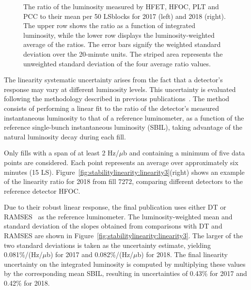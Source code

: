 \begin{figure}[!ht]
\caption[Luminosity Ratios (HFET, HFOC, PLT, PCC) to Mean per 50 LS Blocks (2017 & 2018)]{The ratio of the luminosity measured by HFET, HFOC, PLT and PCC to their mean per 50 LSblocks for 2017 (left) and 2018 (right). The upper row shows the ratio as a function of integrated luminosity, while the lower row displays the luminosity-weighted average of the ratios. The error bars signify the weighted standard deviation over the 20-minute units. The striped area represents the unweighted standard deviation of the four average ratio values.}
\label{fig:stabilitylinearity:stability}
\end{figure}

The linearity systematic uncertainty arises from the fact that a detector’s response may vary at different luminosity levels. This uncertainty is evaluated following the methodology described in previous publications~\cite{pas_17, pas_18}. The method consists of performing a linear fit to the ratio of the detector’s measured instantaneous luminosity to that of a reference luminometer, as a function of the reference single-bunch instantaneous luminosity (SBIL), taking advantage of the natural luminosity decay during each fill.

Only fills with a span of at least 2 Hz/$\mu$b and containing a minimum of five data points are considered. Each point represents an average over approximately six minutes (15 LS). Figure~\ref{fig:stabilitylinearity:linearity3}(right) shows an example of the linearity ratio for 2018 from fill 7272, comparing different detectors to the reference detector HFOC.

Due to their robust linear response, the final publication uses either DT or RAMSES~\cite{CMS:2021xjt} as the reference luminometer. The luminosity-weighted mean and standard deviation of the slopes obtained from comparisons with DT and RAMSES are shown in Figure~\ref{fig:stabilitylinearity:linearity3}. The larger of the two standard deviations is taken as the uncertainty estimate, yielding 0.081\%/(Hz/$\mu$b) for 2017 and 0.082\%/(Hz/$\mu$b) for 2018. The final linearity uncertainty on the integrated luminosity is computed by multiplying these values by the corresponding mean SBIL, resulting in uncertainties of 0.43\% for 2017 and 0.42\% for 2018.


